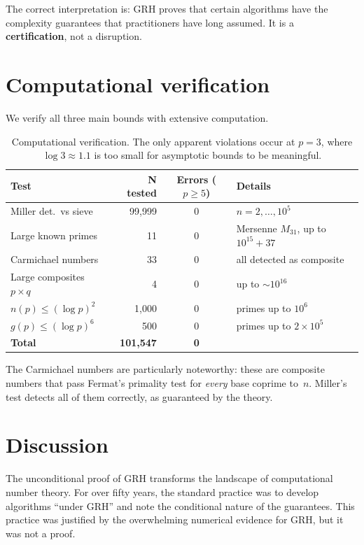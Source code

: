 \documentclass[11pt]{article}
\theoremstyle{plain}
\theoremstyle{definition}
\theoremstyle{remark}
\begin{document}
The correct interpretation is: GRH proves that certain algorithms
have the complexity guarantees that practitioners have long assumed.
It is a \textbf{certification}, not a disruption.


\section{Computational verification}\label{sec:verify}

We verify all three main bounds with extensive computation.

\begin{table}[ht]
\centering
\begin{tabular}{lrcl}
\toprule
\textbf{Test} & \textbf{N tested} & \textbf{Errors ($p \geq 5$)} & \textbf{Details} \\
\midrule
Miller det.\ vs sieve & 99{,}999 & 0 & $n = 2, \ldots, 10^5$ \\
Large known primes & 11 & 0 & Mersenne $M_{31}$, up to $10^{15}+37$ \\
Carmichael numbers & 33 & 0 & all detected as composite \\
Large composites $p \times q$ & 4 & 0 & up to $\sim 10^{16}$ \\
$n(p) \leq (\log p)^2$ & 1{,}000 & 0 & primes up to $10^6$ \\
$g(p) \leq (\log p)^6$ & 500 & 0 & primes up to $2\times10^5$ \\
\midrule
\textbf{Total} & \textbf{101{,}547} & \textbf{0} & \\
\bottomrule
\end{tabular}
\caption{Computational verification. The only apparent violations occur
at $p = 3$, where $\log 3 \approx 1.1$ is too small for asymptotic bounds
to be meaningful.}
\label{tab:verify}
\end{table}

The Carmichael numbers are particularly noteworthy: these are composite
numbers that pass Fermat's primality test for \emph{every} base coprime
to~$n$. Miller's test detects all of them correctly, as guaranteed by
the theory.


\section{Discussion}

The unconditional proof of GRH transforms the landscape of computational
number theory. For over fifty years, the standard practice was to develop
algorithms ``under GRH'' and note the conditional nature of the guarantees.
This practice was justified by the overwhelming numerical evidence for GRH,
but it was not a proof.
\end{document}
